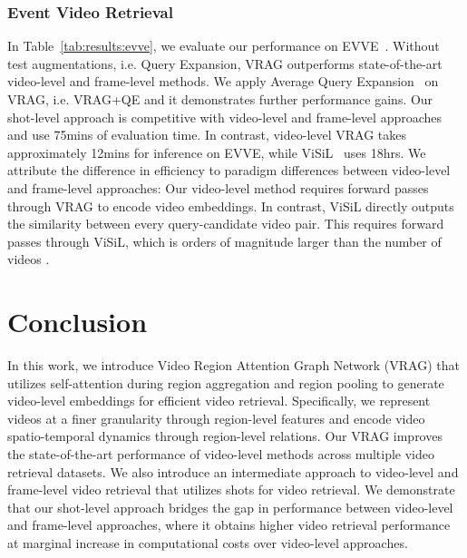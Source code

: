\documentclass[letterpaper]{article} \usepackage{aaai22}  \usepackage{times}  \usepackage{helvet}  \usepackage{courier}  \usepackage[hyphens]{url}  \usepackage{graphicx} \urlstyle{rm} \usepackage{amsmath}
\begin{document}
\subsubsection{Event Video Retrieval}
In Table~\ref{tab:results:evve}, we evaluate our performance on EVVE~\cite{dataset:evve}. Without test augmentations, i.e. Query Expansion, VRAG outperforms state-of-the-art video-level and frame-level methods. We apply Average Query Expansion~\cite{query-expansion} on VRAG, i.e. VRAG+QE and it demonstrates further performance gains. Our shot-level approach is competitive with video-level and frame-level approaches and use 75mins of evaluation time. In contrast, video-level VRAG takes approximately 12mins for inference on EVVE, while ViSiL~\cite{kordopatiszilos2019visil} uses 18hrs. 
We attribute the difference in efficiency to paradigm differences between video-level and frame-level approaches: Our video-level method requires  forward passes through VRAG to encode  video embeddings. In contrast, ViSiL directly outputs the similarity between every query-candidate video pair. This requires  forward passes through ViSiL, which is orders of magnitude larger than the number of videos . 





\section{Conclusion}

In this work, we introduce Video Region Attention Graph Network (VRAG) that utilizes self-attention during region aggregation and region pooling to generate video-level embeddings for efficient video retrieval. 
Specifically, we represent videos at a finer granularity through region-level features and encode video spatio-temporal dynamics through region-level relations. 
Our VRAG improves the state-of-the-art performance of video-level methods across multiple video retrieval datasets. We also introduce an intermediate approach to video-level and frame-level video retrieval that utilizes shots for video retrieval. We demonstrate that our shot-level approach bridges the gap in performance between video-level and frame-level approaches, where it obtains higher video retrieval performance at marginal increase in computational costs over video-level approaches.



\clearpage
\end{document}
